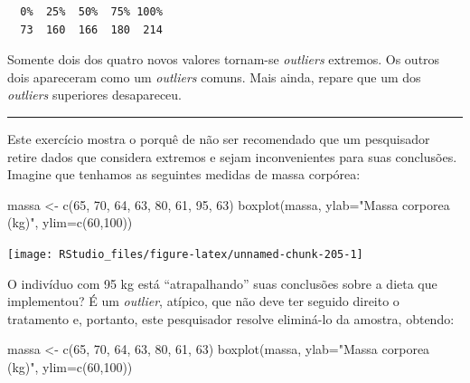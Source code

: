 \documentclass[
]{article}
\newenvironment{Shaded}{\begin{snugshade}}{\end{snugshade}}
\newcommand{\AttributeTok}[1]{\textcolor[rgb]{0.77,0.63,0.00}{#1}}
\newcommand{\DecValTok}[1]{\textcolor[rgb]{0.00,0.00,0.81}{#1}}
\newcommand{\FunctionTok}[1]{\textcolor[rgb]{0.00,0.00,0.00}{#1}}
\newcommand{\NormalTok}[1]{#1}
\newcommand{\OtherTok}[1]{\textcolor[rgb]{0.56,0.35,0.01}{#1}}
\newcommand{\StringTok}[1]{\textcolor[rgb]{0.31,0.60,0.02}{#1}}
\begin{document}
\begin{verbatim}
  0%  25%  50%  75% 100% 
  73  160  166  180  214 
\end{verbatim}

Somente dois dos quatro novos valores tornam-se \emph{outliers}
extremos. Os outros dois apareceram como um \emph{outliers} comuns. Mais
ainda, repare que um dos \emph{outliers} superiores desapareceu.

\begin{center}\rule{0.5\linewidth}{0.5pt}\end{center}

Este exercício mostra o porquê de não ser recomendado que um pesquisador
retire dados que considera extremos e sejam inconvenientes para suas
conclusões. Imagine que tenhamos as seguintes medidas de massa corpórea:

\begin{Shaded}
\begin{Highlighting}[]
\NormalTok{massa }\OtherTok{\textless{}{-}} \FunctionTok{c}\NormalTok{(}\DecValTok{65}\NormalTok{, }\DecValTok{70}\NormalTok{, }\DecValTok{64}\NormalTok{, }\DecValTok{63}\NormalTok{, }\DecValTok{80}\NormalTok{, }\DecValTok{61}\NormalTok{, }\DecValTok{95}\NormalTok{, }\DecValTok{63}\NormalTok{)}
\FunctionTok{boxplot}\NormalTok{(massa, }\AttributeTok{ylab=}\StringTok{"Massa corporea (kg)"}\NormalTok{, }\AttributeTok{ylim=}\FunctionTok{c}\NormalTok{(}\DecValTok{60}\NormalTok{,}\DecValTok{100}\NormalTok{))}
\end{Highlighting}
\end{Shaded}

\begin{center}\texttt{[image: RStudio\_files/figure-latex/unnamed-chunk-205-1]} \end{center}

O indivíduo com 95 kg está ``atrapalhando'' suas conclusões sobre a
dieta que implementou? É um \emph{outlier}, atípico, que não deve ter
seguido direito o tratamento e, portanto, este pesquisador resolve
eliminá-lo da amostra, obtendo:

\begin{Shaded}
\begin{Highlighting}[]
\NormalTok{massa }\OtherTok{\textless{}{-}} \FunctionTok{c}\NormalTok{(}\DecValTok{65}\NormalTok{, }\DecValTok{70}\NormalTok{, }\DecValTok{64}\NormalTok{, }\DecValTok{63}\NormalTok{, }\DecValTok{80}\NormalTok{, }\DecValTok{61}\NormalTok{, }\DecValTok{63}\NormalTok{)}
\FunctionTok{boxplot}\NormalTok{(massa, }\AttributeTok{ylab=}\StringTok{"Massa corporea (kg)"}\NormalTok{, }\AttributeTok{ylim=}\FunctionTok{c}\NormalTok{(}\DecValTok{60}\NormalTok{,}\DecValTok{100}\NormalTok{))}
\end{Highlighting}
\end{Shaded}
\end{document}
